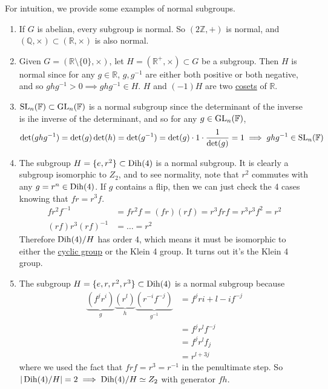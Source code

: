   \begin{example}
    \label{ex:normal-subgroups}
    For intuition, we provide some examples of normal subgroups. 
    \begin{enumerate}
      \item If $G$ is abelian, every subgroup is normal. So $(2\mathbb{Z}, +)$ is normal, and $(\mathbb{Q}, \times) \subset (\mathbb{R}, \times)$ is also normal. 
      \item Given $G = (\mathbb{R} \setminus \{0\}, \times)$, let $H = (\mathbb{R}^+, \times) \subset G$ be a subgroup. Then $H$ is normal since for any $g \in \mathbb{R}$, $g, g^{-1}$ are either both positive or both negative, and so $g h g^{-1} > 0 \implies g h g^{-1} \in H$. $H$ and $(-1)H$ are two \hyperref[def:coset]{cosets} of $\mathbb{R}$. 
      \item $\operatorname{SL}_n (\mathbb{F}) \subset \operatorname{GL}_n (\mathbb{F})$ is a normal subgroup since the determinant of the inverse is ihe inverse of the determinant, and so for any $g \in \operatorname{GL}_n (\mathbb{F})$, 
      \begin{equation}
        \det(g h g^{-1}) = \det(g) \det(h) = \det(g^{-1}) = \det(g) \cdot 1 \cdot \frac{1}{\det(g)} = 1 \implies g h g^{-1} \in \operatorname{SL}_n (\mathbb{F}) 
      \end{equation}

      \item The subgroup $H = \{e, r^2\} \subset \operatorname{Dih}(4)$ is a normal subgroup. It is clearly a subgroup isomorphic to $Z_2$, and to see normality, note that $r^2$ commutes with any $g = r^n \in \operatorname{Dih}(4)$. If $g$ contains a flip, then we can just check the 4 cases knowing that $f r = r^3 f$. 
      \begin{align}
        f r^2 f^{-1} & = f r^2 f = (f r)(r f) = r^3 f r f = r^3 r^3 f^2 = r^2 \\ 
        (rf) r^3 (rf)^{-1} & = \ldots = r^2
      \end{align}
      Therefore $\operatorname{Dih}(4)/H$ has order 4, which means it must be isomorphic to either the \hyperref[def:cyclic-group]{cyclic group} or the Klein 4 group. It turns out it's the Klein 4 group. 

      \item The subgroup $H = \{e, r, r^2, r^3 \} \subset \operatorname{Dih}(4)$ is a normal subgroup because 
      \begin{align}
        \underbrace{(f^j r^i)}_{g} \underbrace{(r^l)}_{h} 
        \underbrace{(r^{-i} f^{-j})}_{g^{-1}} & = f^j r{i + l - i} f^{-j} \\  
                                              & = f^j r^l f^{-j} \\
                                              & = f^j r^l f_j \\
                                              & = r^{l + 3j}
      \end{align}
      where we used the fact that $frf = r^3 = r^{-1}$ in the penultimate step. So $|\operatorname{Dih}(4)/H| = 2 \implies \operatorname{Dih}(4)/H \simeq Z_2$ with generator $fh$. 
    \end{enumerate}
  \end{example}

